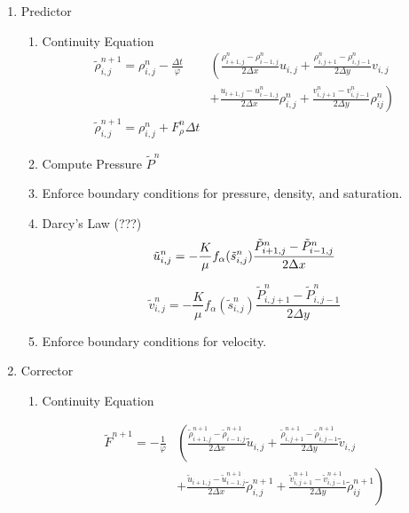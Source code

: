 \documentclass[a4paper,12pt]{article}
\begin{document}
\begin{enumerate}
    \item Predictor
        \begin{enumerate}
            \item Continuity Equation
\begin{align*}
    \tilde \rho_{i, j}^{n+1} = \rho_{i, j}^n
    - \frac{\Delta t}{\varphi} &\left( 
  \frac{\rho_{i+1, j}^n - \rho_{i-1,j}^n}{2\Delta x} u_{i,j}
+ \frac{\rho_{i, j+1}^n - \rho_{i,j-1}^n}{2\Delta y} v_{i,j}
\right. \\
                             &\left.+
  \frac{u_{i+1, j} - u_{i-1,j}^n}{2\Delta x} \rho_{i,j}^n
+ \frac{v_{i, j+1}^n - v_{i,j-1}^n}{2\Delta y} \rho_{ij}^n
    \right) \\
    \tilde \rho_{i, j}^{n + 1}
    = \rho_{i, j}^n + F_\rho^n \Delta t 
\end{align*}

            \item Compute Pressure \(\tilde P^n\)
            \item Enforce boundary conditions for pressure,
                density, and saturation.

            \item Darcy's Law (???)
\[
    \tilde u_{i,j}^n = -\frac{K}{\mu}
    f_\alpha (\tilde s_{i, j}^n)
    \frac{\tilde P_{i + 1, j}^n - \tilde P_{i - 1, j}^n}
    {2\Delta x} \\
\] 

\[
    \tilde v_{i,j}^n = -\frac{K}{\mu}
    f_\alpha(\tilde s_{i, j}^n)
    \frac{\tilde P_{i, j + 1}^n
    - \tilde P_{i, j - 1}^n}{2\Delta y}
\] 
            \item Enforce boundary conditions for velocity.
        \end{enumerate}

    \item Corrector
        \begin{enumerate}
            \item Continuity Equation

\begin{align*}
    \tilde F^{n + 1} = -\frac{1}{\varphi} &\left( 
\frac{\tilde \rho_{i+1, j}^{n + 1}
    - \tilde \rho_{i-1,j}^{n + 1} }{2\Delta x} \tilde u_{i,j}
+ \frac{\tilde \rho_{i, j+1}^{n + 1}
    - \tilde \rho_{i,j-1}^{n + 1} }{2\Delta y} \tilde v_{i,j}
\right.\\
                                          &\left.
+ \frac{\tilde u_{i+1, j}
    - \tilde u_{i-1,j}^{n + 1}}{2
\Delta x} \tilde \rho_{i,j}^{n + 1}
+ \frac{\tilde v_{i, j+1}^{n + 1}
- \tilde v_{i,j-1}^{n + 1}}{2\Delta y}
\tilde \rho_{ij}^{n + 1}
    \right) 
\end{align*}


\end{enumerate}
\end{enumerate}
\end{document}
